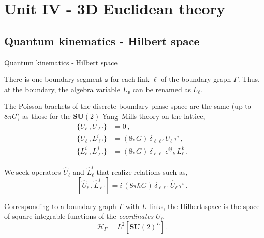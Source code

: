 \documentclass{beamer}
\newcommand\italictext[1]{\textcolor{italics}{\textit{#1}}}
\begin{document}
\section{Unit IV - 3D Euclidean theory}

\subsection{Quantum kinematics - Hilbert space}

\begin{frame}{Quantum kinematics - Hilbert space}
    \begin{list}{\maltese}{\leftmargin=1em \itemindent=0em}
        \item<1-> There is one boundary segment $\mathtt{s}$ for each link $\ell$ of the boundary graph $\Gamma$. Thus, at the boundary, the algebra variable $L_\mathtt{s}$ can be renamed as $L_\ell$.
        \item<2-> The Poisson brackets of the discrete boundary phase space are the same (up to $8\pi G$) as those for the $\mathbf{SU}(2)$ Yang–Mills theory on the lattice,
        \begin{align}
            \{U_\ell\,,U_{\ell'}\}&=0\,,\\
            \{U_{\ell}\,,L^i_{\ell'}\}&=(8\pi G)\, \delta_{\ell\ell'}\,U_\ell\,\tau^i\,,\\
            \{L^i_{\ell}\,,L^j_{\ell'}\}&=(8\pi G)\, \delta_{\ell\ell'}\,{\epsilon^{ij}}_k\, L^k_{\ell}\,.
        \end{align}
        \item<3-> We seek operators $\hat{U}_\ell$ and $\hat{L}^i_\ell$ that realize relations such as,
        \begin{equation}\label{3d_comm}
            [\hat{U}_{\ell}\,,\hat{L}^i_{\ell'}]=i\,(8\pi\hbar G)\, \delta_{\ell\ell'}\,\hat{U}_\ell\,\tau^i\,.
        \end{equation}
        \item<4-> Corresponding to a boundary graph $\Gamma$ with $L$ links, the Hilbert space is the space of square integrable functions of the \italictext{coordinates} $U_\ell$,
        \begin{equation}
            \mathcal{H}_\Gamma=L^2[{\mathbf{SU}(2)}^L]\,.
        \end{equation}
    \end{list}
\end{frame}
\end{document}
